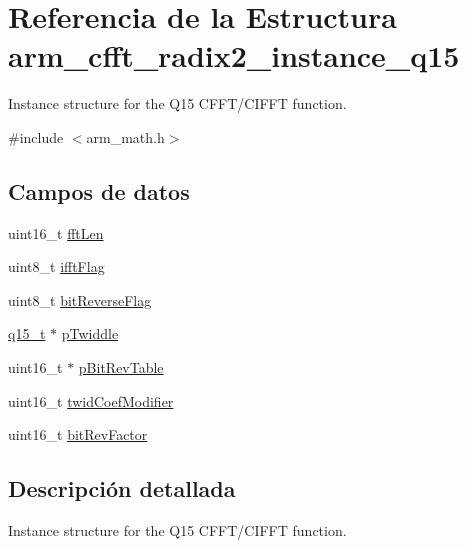 \hypertarget{structarm__cfft__radix2__instance__q15}{}\section{Referencia de la Estructura arm\+\_\+cfft\+\_\+radix2\+\_\+instance\+\_\+q15}
\label{structarm__cfft__radix2__instance__q15}


Instance structure for the Q15 C\+F\+F\+T/\+C\+I\+F\+FT function.  




{\ttfamily \#include $<$arm\+\_\+math.\+h$>$}

\subsection*{Campos de datos}
\begin{DoxyCompactItemize}
\item 
uint16\+\_\+t \hyperlink{structarm__cfft__radix2__instance__q15_ab8db3bbe7c61e6bb8ca2a55e3446e11a}{fft\+Len}
\item 
uint8\+\_\+t \hyperlink{structarm__cfft__radix2__instance__q15_ad6ca6e223f986ebfd94c5ee1e410aa73}{ifft\+Flag}
\item 
uint8\+\_\+t \hyperlink{structarm__cfft__radix2__instance__q15_a09a221a818c6d0e064557a99e2fe9a8b}{bit\+Reverse\+Flag}
\item 
\hyperlink{arm__math_8h_ab5a8fb21a5b3b983d5f54f31614052ea}{q15\+\_\+t} $\ast$ \hyperlink{structarm__cfft__radix2__instance__q15_aa8c837c05b2c910342ab8f171d30dc02}{p\+Twiddle}
\item 
uint16\+\_\+t $\ast$ \hyperlink{structarm__cfft__radix2__instance__q15_a46a2fb328199897af100fea0bfdf59aa}{p\+Bit\+Rev\+Table}
\item 
uint16\+\_\+t \hyperlink{structarm__cfft__radix2__instance__q15_afe772e5b5001c9d8e85032115a8df5bf}{twid\+Coef\+Modifier}
\item 
uint16\+\_\+t \hyperlink{structarm__cfft__radix2__instance__q15_a33386d95319dc3ee7097b3a8e52e01ec}{bit\+Rev\+Factor}
\end{DoxyCompactItemize}


\subsection{Descripción detallada}
Instance structure for the Q15 C\+F\+F\+T/\+C\+I\+F\+FT function. 

